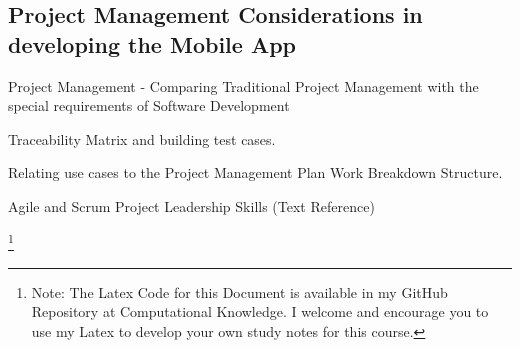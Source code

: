 \documentclass{article}
\begin{document}
\subsection{Project Management Considerations in developing the Mobile App}

\item Project Management - Comparing Traditional Project Management with the special requirements of Software Development
\item Traceability Matrix and building test cases.
\item Relating use cases to the Project Management Plan Work Breakdown Structure.
\item Agile and Scrum Project Leadership Skills (Text Reference)



\footnote{Note: The Latex Code for this Document is available in my GitHub Repository at 
    Computational Knowledge. I welcome and encourage you to use my Latex to develop your 
    own study notes for this course.}
 
\end{document}
